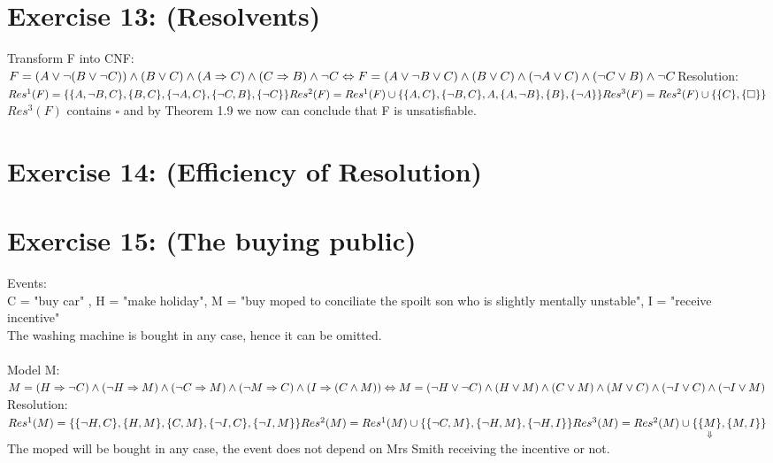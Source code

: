 \documentclass[12pt]{article}
\begin{document}
 

\rhead{\today}


\section*{Exercise 13:  (Resolvents)}
Transform F into CNF:\\
$F = (A \lor \lnot(B \lor \lnot C)) \land (B \lor C) \land (A \Rightarrow C) \land (C \Rightarrow B) \land \lnot C \\
\Leftrightarrow F = (A \lor \lnot B \lor C) \land (B \lor C) \land (\lnot A \lor C) \land (\lnot C \lor B) \land \lnot C\\ \\
$Resolution:\\$
Res^1(F) = \{ \{A, \lnot B, C \},\{B,C\},\{\lnot A, C\},\{\lnot C, B\},\{ \lnot C\}   \}\\
Res^2(F) = Res^1(F) \cup \{\{A, C\},\{\lnot B, C\},{A},\{A, \lnot B\},\{B\},\{\lnot A\}     \}  \\
Res^3(F) = Res^2(F) \cup \{ \{C\},\{\square \} \} \\ \\
$
$Res^3(F)$ contains $\square$ and by Theorem 1.9 we now can conclude that F is unsatisfiable.


\section*{Exercise 14: (Efficiency of Resolution)}

\section*{Exercise 15: (The buying public)}
Events: \\
C = "buy car" , H = "make holiday", M = "buy moped to conciliate the spoilt son who is slightly mentally unstable", I = "receive incentive"\\
The washing machine is bought in any case, hence it can be omitted.\\ \\
Model M:\\
$M = (H \Rightarrow \lnot C) \land (\lnot H \Rightarrow M) \land (\lnot C \Rightarrow M) \land (\lnot M \Rightarrow C) \land (I \Rightarrow (C \land M))\\
\Leftrightarrow M = (\lnot H \lor \lnot C) \land (H \lor M) \land (C \lor M) \land (M \lor C) \land (\lnot I \lor C) \land (\lnot I \lor M)\\ \\
$Resolution:\\$
Res^1(M) = \{\{\lnot H, C\},\{H, M\},\{C,M\},\{\lnot I, C\},\{\lnot I, M\}\} \\
Res^2(M) = Res^1(M) \cup \{\{\lnot C, M\},\{\lnot H, M\},\{\lnot H, I\}\} \\
Res^3(M) = Res^2(M) \cup \{ \underset{\Downarrow}{\{M\}}, \{M, I\}\} \\
$
The moped will be bought in any case, the event does not depend on Mrs Smith receiving the incentive or not.
\end{document}
